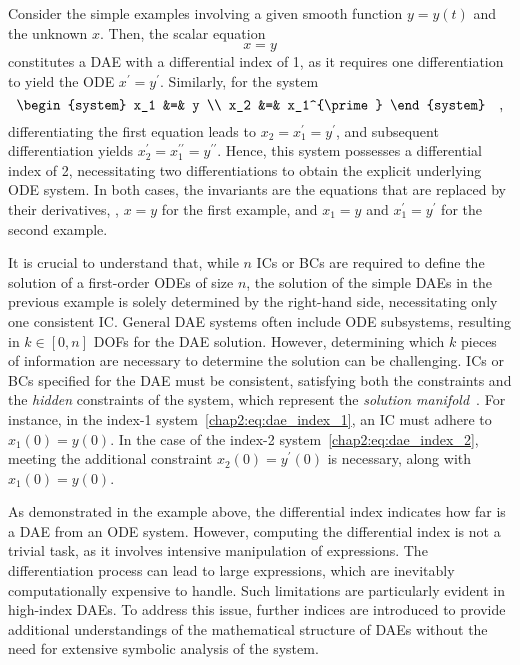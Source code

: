 \begin{example}
  Consider the simple examples involving a given smooth function $y = y(t)$ and the unknown $x$. Then, the scalar equation
  \begin{equation}
    x = y
    \label{chap2:eq:dae_index_1}
  \end{equation}
  constitutes a \ac{DAE} with a differential index of 1, as it requires one differentiation to yield the \ac{ODE} $x^{\prime} = y^{\prime}$. Similarly, for the system
  \begin{equation}
    \begin{system}
      x_1 &=& y \\
      x_2 &=& x_1^{\prime}
    \end{system} \quad \text{,}
    \label{chap2:eq:dae_index_2}
  \end{equation}
  differentiating the first equation leads to $x_2 = x_1^{\prime} = y^{\prime}$, and subsequent differentiation yields $x_2^{\prime} = x_1^{\prime\prime} = y^{\prime\prime}$. Hence, this system possesses a differential index of 2, necessitating two differentiations to obtain the explicit underlying \ac{ODE} system. In both cases, the invariants are the equations that are replaced by their derivatives, \ie{}, $x = y$ for the first example, and $x_1 = y$ and $x_1^{\prime} = y^{\prime}$ for the second example.
\end{example}

It is crucial to understand that, while $n$ \acp{IC} or \acp{BC} are required to define the solution of a first-order \acp{ODE} of size $n$, the solution of the simple \acp{DAE} in the previous example is solely determined by the right-hand side, necessitating only one consistent \ac{IC}. General \ac{DAE} systems often include \ac{ODE} subsystems, resulting in $k \in [0, n]$ \acp{DOF} for the \ac{DAE} solution. However, determining which $k$ pieces of information are necessary to determine the solution can be challenging. \acp{IC} or \acp{BC} specified for the \ac{DAE} must be consistent, satisfying both the constraints and the \emph{hidden} constraints of the system, which represent the \emph{solution manifold}~\cite{rheinboldt1984differential}. For instance, in the index-1 system~\eqref{chap2:eq:dae_index_1}, an \ac{IC} must adhere to $x_1(0) = y(0)$. In the case of the index-2 system~\eqref{chap2:eq:dae_index_2}, meeting the additional constraint $x_2(0) = y^{\prime}(0)$ is necessary, along with $x_1(0) = y(0)$.

As demonstrated in the example above, the differential index indicates how far is a \ac{DAE} from an \ac{ODE} system. However, computing the differential index is not a trivial task, as it involves intensive manipulation of expressions. The differentiation process can lead to large expressions, which are inevitably computationally expensive to handle. Such limitations are particularly evident in high-index \acp{DAE}. To address this issue, further indices are introduced to provide additional understandings of the mathematical structure of \acp{DAE} without the need for extensive symbolic analysis of the system.

